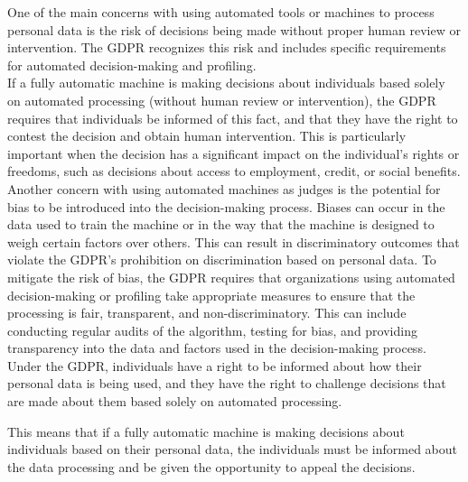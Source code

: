 \documentclass{article}
\begin{document}
One of the main concerns with using automated tools or machines to process personal data is the risk of decisions being 
made without proper human review or intervention. The GDPR recognizes this risk and includes specific requirements for
 automated decision-making and profiling. \\

If a fully automatic machine is making decisions about individuals based solely on automated processing 
(without human review or intervention), the GDPR requires that individuals be informed of this fact, 
and that they have the right to contest the decision and obtain human intervention. This is particularly important 
when the decision has a significant impact on the individual’s rights or freedoms, such as decisions about access 
to employment, credit, or social benefits. \\

Another concern with using automated machines as judges is the potential for bias to be introduced into 
the decision-making process. Biases can occur in the data used to train the machine or in the way that the 
machine is designed to weigh certain factors over others. This can result in discriminatory outcomes that violate
the GDPR’s prohibition on discrimination based on personal data. 
To mitigate the risk of bias, the GDPR requires that organizations using automated decision-making 
or profiling take appropriate measures to ensure that the processing is fair, transparent, and 
non-discriminatory. This can include conducting regular audits of the algorithm, testing for 
bias, and providing transparency into the data and factors used in the decision-making process. \\

Under the GDPR, individuals have a right to be informed about how their personal data is being used, and they have 
the right to challenge decisions that are made about them based solely on automated processing.

This means that 
if a fully automatic machine is making decisions about individuals based on their personal data, the individuals 
must be informed about the data processing and be given the opportunity to appeal the decisions.
\end{document}
